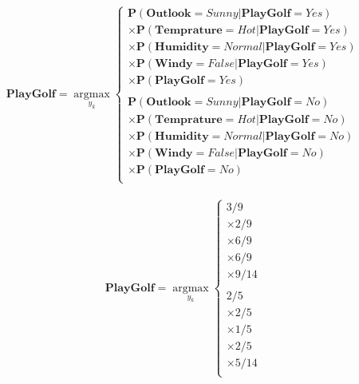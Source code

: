 \documentclass[11pt, a4paper]{article}
\begin{document}
\begin{align*}
	\mathbf{PlayGolf} = \operatorname*{argmax}_{y_k}\left\{          
	\begin{array}{ll}                                                
	\mathbf{P}(\textbf{Outlook}=Sunny|\textbf{PlayGolf}=Yes)         \\
	\times\mathbf{P}(\textbf{Temprature}=Hot|\textbf{PlayGolf}=Yes)  \\
	\times\mathbf{P}(\textbf{Humidity}=Normal|\textbf{PlayGolf}=Yes) \\
	\times\mathbf{P}(\textbf{Windy}=False|\textbf{PlayGolf}=Yes)     \\
	\times\mathbf{P}(\textbf{PlayGolf}=Yes)                          \\
	                                                                 \\
	\mathbf{P}(\textbf{Outlook}=Sunny|\textbf{PlayGolf}=No)          \\
	\times\mathbf{P}(\textbf{Temprature}=Hot|\textbf{PlayGolf}=No)   \\
	\times\mathbf{P}(\textbf{Humidity}=Normal|\textbf{PlayGolf}=No)  \\
	\times\mathbf{P}(\textbf{Windy}=False|\textbf{PlayGolf}=No)      \\
	\times\mathbf{P}(\textbf{PlayGolf}=No)                           \\
	\end{array}                                                      
	\right.                                                          
\end{align*}

\begin{align*}
	\mathbf{PlayGolf} = \operatorname*{argmax}_{y_k}\left\{ 
	\begin{array}{ll}                                       
	3/9                                                     \\
	\times2/9                                               \\
	\times6/9                                               \\
	\times6/9                                               \\
	\times9/14                                              \\
	                                                        \\
	2/5                                                     \\
	\times2/5                                               \\
	\times1/5                                               \\
	\times2/5                                               \\
	\times5/14                                              \\
	\end{array}                                             
	\right.                                                 
\end{align*}
\end{document}
